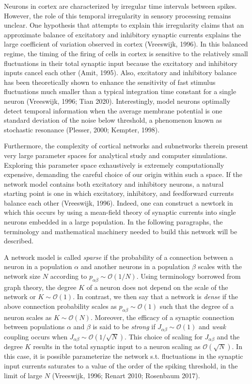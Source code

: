 \documentclass{ucetd}
\begin{document}
Neurons in cortex are characterized by irregular time intervals between spikes. However, the role of this temporal irregularity in sensory processing remains unclear. One hypothesis that attempts to explain this irregularity claims that an approximate balance of excitatory and inhibitory synaptic currents explains the large coefficient of variation observed in cortex (Vreeswijk, 1996). In this balanced regime, the timing of the firing of cells in cortex is sensitive to the relatively small fluctuations in their total synaptic input because the excitatory and inhibitory inputs cancel each other (Amit, 1995). Also, excitatory and inhibitory balance has been theoretically shown to enhance the sensitivity of fast stimulus fluctuations much smaller than a typical integration time constant for a single neuron (Vreeswijk, 1996; Tian 2020). Interestingly, model neurons optimally detect temporal information when the average membrane potential is one standard deviation of the noise below threshold, a phenomenon known as stochastic resonance (Plesser, 2000; Kempter, 1998).

Furthermore, the complexity of cortical networks and subnetworks therein present very large parameter spaces for analytical study and computer simulations. Exploring this parameter space exhaustively is extremely computationally expensive, demanding the careful choice of our origin within such a space. If the network model contains both excitatory and inhibitory neurons, a natural starting point is one in which excitatory, inhibitory, and feedforward currents balance each other (Vreeswijk, 1996). Indeed, one can construct a newtork in which this occurs by using a mean-field theory of synaptic currents into single neurons embedded in a large population. In the following paragraphs, the terminology and mathematical machinery needed to build this network will be described.


A network model is called \emph{sparse} if the probability of a connection between a neuron in a population $\alpha$ and another neurons in a population $\beta$ scales with the network size $N$ according to $p_{\alpha\beta} \sim \mathcal{O}(1/N)$. Using terminology borrowed from graph theory, the degree $K$ of a neuron does not depend on the scale of the network or $K \sim \mathcal{O}(1)$. In contrast, we then say that a network is \emph{dense} if the above connection probability scales as $p_{\alpha\beta} \sim \mathcal{O}(1)$ such that the degree of a neuron scales as $K \sim \mathcal{O}(N)$. Moreover, the efficacy of a synaptic connection between populations $\alpha$ and $\beta$ is said to be \emph{strong} if $J_{\alpha\beta} \sim \mathcal{O}(1)$ and \emph{weak} coupling occurs when $J_{\alpha\beta} \sim \mathcal{O}(1/\sqrt{N})$. This choice of scaling for $J_{\alpha\beta}$ and the degree $K$ results in the total synaptic input to a neuron scaling as $\mathcal{O}(\sqrt{N})$. In this case, it is possible parameterize the network s.t. fluctuations in the synaptic input currents saturates to a value of the order of the spiking threshold, in the limit of large $N$ (Vreeswijk, 1996; Renart 2010; Rosenbaum 2017).  
\end{document}
